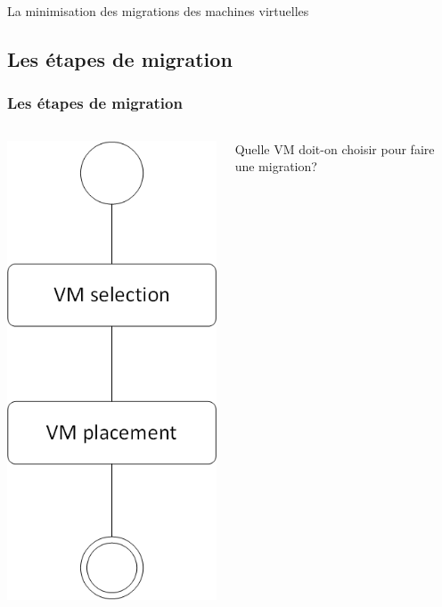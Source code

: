 \documentclass[xcolor=dvipsnames]{beamer}
\begin{document}
\begin{frame}

\begin{block}{}
\begin{center}
\Huge La minimisation des migrations des machines virtuelles
\end{center}
\end{block}

\end{frame}



\subsection{Les étapes de migration}
\begin{frame}
\frametitle{Les étapes de migration}
\begin{columns}
\begin{column}{0.40\textwidth}
\begin{center}
\includegraphics[scale=0.38]{DAM.png}
\end{center}
\end{column}
\begin{column}{0.55\textwidth}
\begin{block}{}
\begin{minipage}{\textwidth}
Quelle VM doit-on choisir pour  faire une migration?
\end{minipage}
\end{block}


\end{column}
\end{columns}
\end{frame}
\end{document}

